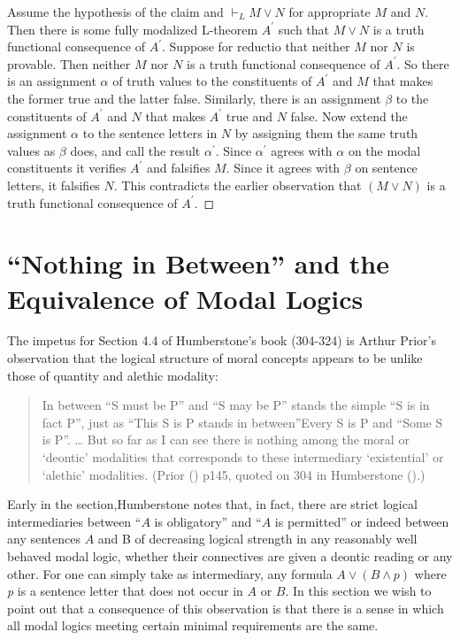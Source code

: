 \documentclass[
  11pt,
  letterpaper,
  DIV=11,
  numbers=noendperiod,
  twoside]{scrartcl}
\begin{document}
Assume the hypothesis of the claim and \(\vdash_LM\vee N\) for
appropriate \(M\) and \(N\). Then there is some fully modalized
L-theorem \(A^\prime\) such that \(M\vee N\) is a truth functional
consequence of \(A^\prime\). Suppose for reductio that neither \(M\) nor
\(N\) is provable. Then neither \(M\) nor \(N\) is a truth functional
consequence of \(A^\prime\). So there is an assignment \(\alpha\) of
truth values to the constituents of \(A^\prime\) and \(M\) that makes
the former true and the latter false. Similarly, there is an assignment
\(\beta\) to the constituents of \(A^\prime\) and \(N\) that makes
\(A^\prime\) true and \(N\) false. Now extend the assignment \(\alpha\)
to the sentence letters in \(N\) by assigning them the same truth values
as \(\beta\) does, and call the result \(\alpha^\prime\). Since
\(\alpha^\prime\) agrees with \(\alpha\) on the modal constituents it
verifies \(A^\prime\) and falsifies \(M\). Since it agrees with
\(\beta\) on sentence letters, it falsifies \(N\). This contradicts the
earlier observation that \((M\vee N)\) is a truth functional consequence
of \(A^\prime\).~◻

\section{``Nothing in Between'' and the Equivalence of Modal
Logics}\label{nothing-in-between-and-the-equivalence-of-modal-logics}

The impetus for Section 4.4 of Humberstone's book (304-324) is Arthur
Prior's observation that the logical structure of moral concepts appears
to be unlike those of quantity and alethic modality:

\begin{quote}
In between ``S must be P'' and ``S may be P'' stands the simple ``S is
in fact P'', just as ``This S is P stands in between''Every S is P and
``Some S is P''. \ldots{} But so far as I can see there is nothing among
the moral or `deontic' modalities that corresponds to these intermediary
`existential' or `alethic' modalities. (Prior
() p145, quoted on 304 in
Humberstone ().)
\end{quote}

Early in the section,Humberstone notes that, in fact, there are strict
logical intermediaries between ``\(A\) is obligatory'' and ``\(A\) is
permitted'' or indeed between any sentences \(A\) and B of decreasing
logical strength in any reasonably well behaved modal logic, whether
their connectives are given a deontic reading or any other. For one can
simply take as intermediary, any formula \(A\vee (B\wedge p)\) where
\emph{p} is a sentence letter that does not occur in \(A\) or \(B\). In
this section we wish to point out that a consequence of this observation
is that there is a sense in which all modal logics meeting certain
minimal requirements are the same.
\end{document}
